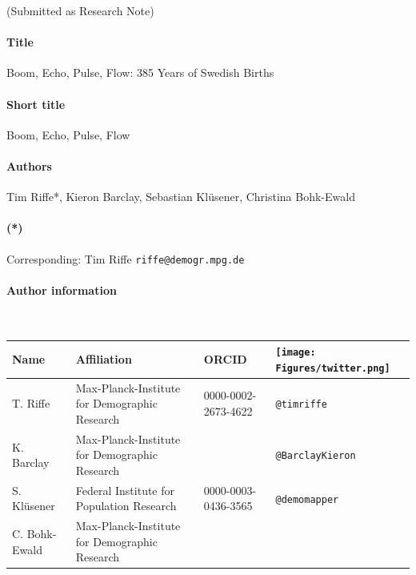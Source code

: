\documentclass{article}
\begin{document}
(Submitted as Research Note)
\paragraph{Title} Boom, Echo, Pulse, Flow: 385 Years of Swedish Births
\paragraph{Short title} Boom, Echo, Pulse, Flow
\paragraph{Authors} Tim Riffe*, Kieron Barclay, Sebastian Kl\"usener, Christina Bohk-Ewald
\paragraph{(*)} Corresponding: Tim Riffe \texttt{riffe@demogr.mpg.de}

\paragraph{Author information} ~
\begin{table}[ht]
\begin{center}
\begin{tabular}{llll}
Name & Affiliation & ORCID & \texttt{[image: Figures/twitter.png]}  \\ \hline
T. Riffe & Max-Planck-Institute for Demographic Research & 0000-0002-2673-4622 & \texttt{@timriffe}  \\
K. Barclay & Max-Planck-Institute for Demographic Research &  & \texttt{@BarclayKieron}  \\
S. Kl\"usener &Federal Institute for Population Research& 0000-0003-0436-3565 & \texttt{@demomapper}  \\
C. Bohk-Ewald & Max-Planck-Institute for Demographic Research &  &
\end{tabular}
\end{center}
\end{table}
\end{document}
